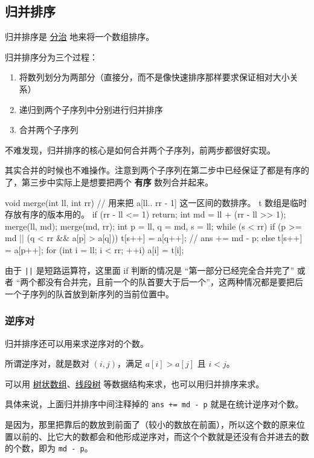 \subsection{归并排序}

归并排序是 \href{/basic/divide-and-conquer}{分治} 地来将一个数组排序。

归并排序分为三个过程：

\begin{enumerate}
\item 将数列划分为两部分（直接分，而不是像快速排序那样要求保证相对大小关系）
\item 递归到两个子序列中分别进行归并排序
\item 合并两个子序列
\end{enumerate}

不难发现，归并排序的核心是如何合并两个子序列，前两步都很好实现。

其实合并的时候也不难操作。注意到两个子序列在第二步中已经保证了都是有序的了，第三步中实际上是想要把两个 \textbf{有序} 数列合并起来。

\begin{cppcode}
void merge(int ll, int rr) {
  // 用来把 a[ll.. rr - 1] 这一区间的数排序。 t 数组是临时存放有序的版本用的。
  if (rr - ll <= 1) return;
  int md = ll + (rr - ll >> 1);
  merge(ll, md);
  merge(md, rr);
  int p = ll, q = md, s = ll;
  while (s < rr) {
    if (p >= md || (q < rr && a[p] > a[q])) {
      t[s++] = a[q++];
      // ans += md - p;
    } else
      t[s++] = a[p++];
  }
  for (int i = ll; i < rr; ++i) a[i] = t[i];
}
\end{cppcode}

由于 \texttt{||} 是短路运算符，这里面 if 判断的情况是 “第一部分已经完全合并完了” 或者 “两个都没有合并完，且前一个的队首要大于后一个”，这两种情况都是要把后一个子序列的队首放到新序列的当前位置中。

\subsubsection{逆序对}

归并排序还可以用来求逆序对的个数。

所谓逆序对，就是数对 $(i, j)$，满足 $a[i] > a[j]$ 且 $i < j$。

可以用 \href{/ds/bit}{树状数组}、\href{/ds/segment/}{线段树} 等数据结构来求，也可以用归并排序来求。

具体来说，上面归并排序中间注释掉的 \texttt{ans += md - p} 就是在统计逆序对个数。

是因为，那里把靠后的数放到前面了（较小的数放在前面），所以这个数的原来位置以前的、比它大的数都会和他形成逆序对，而这个个数就是还没有合并进去的数的个数，即为 \texttt{md - p}。

